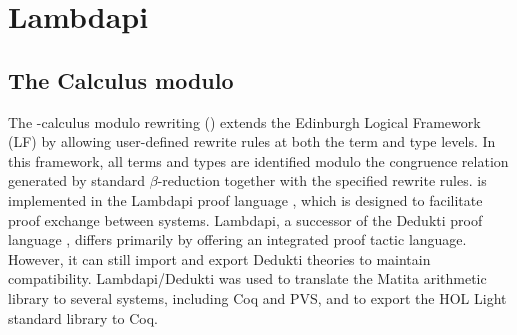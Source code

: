 \chapter{Lambdapi}\label{ch:intro-lambdapi}

\section{The \texorpdfstring{\lp}-Calculus modulo}

The \lp-calculus modulo rewriting (\lpm)  extends the Edinburgh Logical Framework (LF) \cite{lf} by allowing user-defined rewrite rules at both the term and type levels. 
In this framework, all terms and types are identified modulo the congruence relation generated by standard $\beta$-reduction together with the specified rewrite rules.
\lpm{}is implemented in the Lambdapi proof language \cite{lambdapi}, which is designed to facilitate proof exchange between systems.
Lambdapi, a successor of the Dedukti proof language \cite{Dedukti-ref, Dedukti-ref2}, differs primarily by offering an integrated proof tactic language. 
However, it can still import and export Dedukti theories to maintain compatibility.
Lambdapi/Dedukti was used to translate \cite{thire:tel-03224039} the Matita arithmetic library to several systems, including Coq and PVS, and to export \cite{blanqui:hal-04613926} the HOL Light standard library to Coq.


